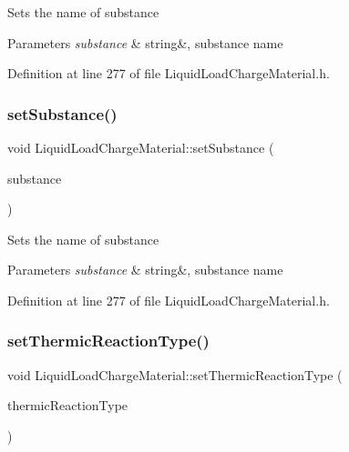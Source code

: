 Sets the name of substance 
\begin{DoxyParams}{Parameters}
{\em substance} & string\&, substance name \\
\hline
\end{DoxyParams}


Definition at line 277 of file Liquid\+Load\+Charge\+Material.\+h.

\mbox{\label{class_liquid_load_charge_material_a85bb43270c6a11a1eaf51f00da16746a}} 
\subsubsection{\texorpdfstring{set\+Substance()}{setSubstance()}\hspace{0.1cm}{\footnotesize\ttfamily [3/3]}}
{\footnotesize\ttfamily void Liquid\+Load\+Charge\+Material\+::set\+Substance (\begin{DoxyParamCaption}\item[{std\+::string const \&}]{substance }\end{DoxyParamCaption})\hspace{0.3cm}{\ttfamily [inline]}}

Sets the name of substance 
\begin{DoxyParams}{Parameters}
{\em substance} & string\&, substance name \\
\hline
\end{DoxyParams}


Definition at line 277 of file Liquid\+Load\+Charge\+Material.\+h.

\mbox{\label{class_liquid_load_charge_material_a39c258d0bfdcfa352590d411a8c4e882}} 
\subsubsection{\texorpdfstring{set\+Thermic\+Reaction\+Type()}{setThermicReactionType()}\hspace{0.1cm}{\footnotesize\ttfamily [1/3]}}
{\footnotesize\ttfamily void Liquid\+Load\+Charge\+Material\+::set\+Thermic\+Reaction\+Type (\begin{DoxyParamCaption}\item[{\hyperlink{namespace_load_charge_material_a51d4263e865a5d86236622dd3fe23fd1}{Load\+Charge\+Material\+::\+Thermic\+Reaction\+Type}}]{thermic\+Reaction\+Type }\end{DoxyParamCaption})\hspace{0.3cm}{\ttfamily [inline]}}

